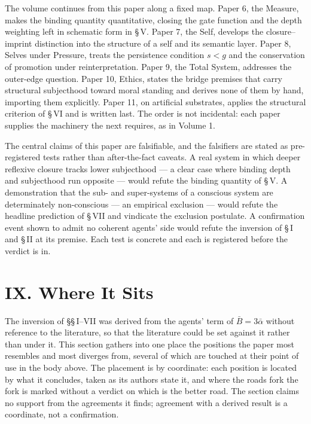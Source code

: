 \documentclass[11pt,oneside]{report}
\theoremstyle{definition}
\theoremstyle{remark}
\begin{document}
The volume continues from this paper along a fixed map. Paper 6, the
Measure, makes the binding quantity quantitative, closing the gate
function and the depth weighting left in schematic form in \S\,V. Paper 7,
the Self, develops the closure--imprint distinction into the structure of
a self and its semantic layer. Paper 8, Selves under Pressure, treats the
persistence condition \ensuremath{s < g} and the conservation of promotion
under reinterpretation. Paper 9, the Total System, addresses the
outer-edge question. Paper 10, Ethics, states the bridge premises that
carry structural subjecthood toward moral standing and derives none of
them by hand, importing them explicitly. Paper 11, on artificial
substrates, applies the structural criterion of \S\,VI and is written
last. The order is not incidental: each paper supplies the machinery the
next requires, as in Volume 1.

The central claims of this paper are falsifiable, and the falsifiers are
stated as pre-registered tests rather than after-the-fact caveats. A real
system in which deeper reflexive closure tracks lower subjecthood --- a
clear case where binding depth and subjecthood run opposite --- would
refute the binding quantity of \S\,V. A demonstration that the sub- and
super-systems of a conscious system are determinately non-conscious ---
an empirical exclusion --- would refute the headline prediction of \S\,VII
and vindicate the exclusion postulate. A confirmation event shown to
admit no coherent agents' side would refute the inversion of \S\,I and
\S\,II at its premise. Each test is concrete and each is registered before
the verdict is in.

\section*{IX. Where It Sits}

The inversion of \S\S\,I--VII was derived from the agents' term of $\bar{B} = 3\bar{\alpha}$ without reference to the literature, so that the literature could be set against it rather than under it. This section gathers into one place the positions the paper most resembles and most diverges from, several of which are touched at their point of use in the body above. The placement is by coordinate: each position is located by what it concludes, taken as its authors state it, and where the roads fork the fork is marked without a verdict on which is the better road. The section claims no support from the agreements it finds; agreement with a derived result is a coordinate, not a confirmation.
\end{document}
